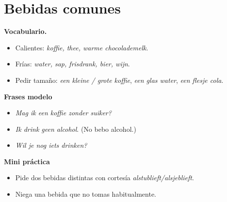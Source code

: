 \section{Bebidas comunes}
\textbf{Vocabulario.}
\begin{itemize}[leftmargin=*]
  \item Calientes: \textit{koffie, thee, warme chocolademelk}.
  \item Frías: \textit{water, sap, frisdrank, bier, wijn}.
  \item Pedir tamaño: \textit{een kleine / grote koffie}, \textit{een glas water}, \textit{een flesje cola}.
\end{itemize}

\textbf{Frases modelo}
\begin{itemize}[leftmargin=*]
  \item \textit{Mag ik een koffie zonder suiker?}
  \item \textit{Ik drink geen alcohol}. (No bebo alcohol.)
  \item \textit{Wil je nog iets drinken?}
\end{itemize}

\textbf{Mini práctica}
\begin{itemize}[leftmargin=*]
  \item Pide dos bebidas distintas con cortesía \textit{alstublieft/alsjeblieft}.
  \item Niega una bebida que no tomas habitualmente.
\end{itemize}
